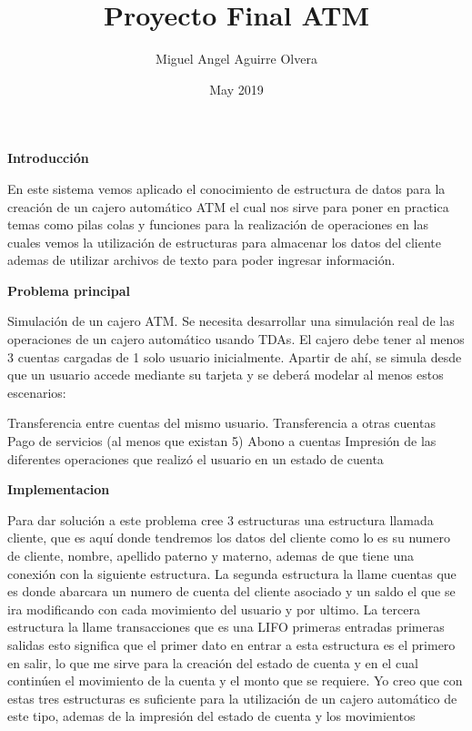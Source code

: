 \documentclass{article}
\title{Proyecto Final ATM}
\author{Miguel Angel Aguirre Olvera }
\date{May 2019}
\begin{document}
\maketitle 

\begin{multicols}{2}

\begin{center}
\textbf{Introducción}
\end{center}
En este sistema vemos aplicado el conocimiento de estructura de datos para la creación de un cajero automático ATM el cual nos sirve para poner en practica temas como pilas colas y funciones para la realización de operaciones en las cuales vemos la utilización de estructuras para almacenar los datos del cliente ademas de utilizar archivos de texto para poder ingresar información.
\begin{center}
\textbf{Problema principal}
\end{center}
Simulación  de  un  cajero  ATM.  Se  necesita  desarrollar una  simulación  real  de  las  operaciones  de  un  cajero automático usando TDAs. El cajero debe tener al menos 3 cuentas  cargadas  de  1  solo  usuario  inicialmente.  Apartir  de  ahí,  se  simula  desde  que  un  usuario accede mediante su tarjeta y se deberá modelar al menos estos escenarios: 

Transferencia entre cuentas del mismo usuario.
Transferencia a otras cuentas
Pago de servicios (al menos que existan 5)
Abono a cuentas
Impresión  de  las  diferentes  operaciones  que  realizó  el usuario en un estado de cuenta

\begin{center}
\textbf{Implementacion}
\end{center}
 Para dar solución a este problema cree 3 estructuras
 una estructura llamada cliente, que es aquí donde tendremos los datos del cliente como lo es su numero de cliente, nombre, apellido paterno y materno,
ademas de que tiene una conexión con la siguiente estructura.
 La segunda estructura la llame cuentas que es donde abarcara un numero de cuenta del cliente asociado y un saldo el que se ira modificando con cada movimiento del usuario y por ultimo.
 La tercera estructura la llame transacciones que es una LIFO primeras entradas primeras salidas esto significa que el primer dato en entrar a esta estructura es el primero en salir, lo que me sirve para la creación del estado de cuenta y en el cual continúen el movimiento de la cuenta y el monto que se requiere.
 Yo creo que con estas tres estructuras es suficiente para la utilización de un cajero automático de este tipo, ademas de la impresión del estado de cuenta y los movimientos
 

\end{multicols}
\end{document}
